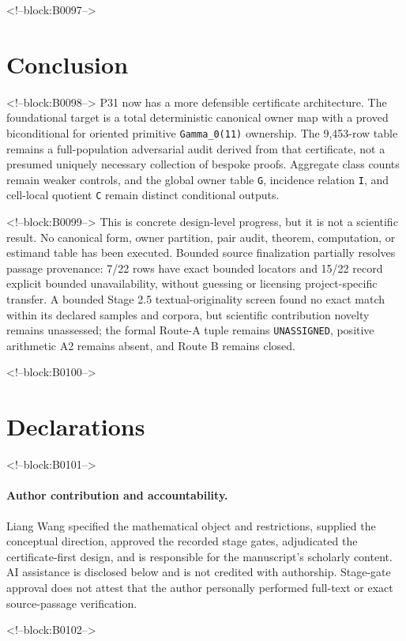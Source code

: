\documentclass[11pt]{article}
\begin{document}
<!--block:B0097-->
\hypertarget{10-conclusion}{%
\section{Conclusion}\label{10-conclusion}}

<!--block:B0098-->
P31 now has a more defensible certificate architecture. The foundational
target is a total deterministic canonical owner map with a proved
biconditional for oriented primitive \texttt{Gamma\_0(11)} ownership.
The 9,453-row table remains a full-population adversarial audit derived
from that certificate, not a presumed uniquely necessary collection of
bespoke proofs. Aggregate class counts remain weaker controls, and the
global owner table \texttt{G}, incidence relation \texttt{I}, and
cell-local quotient \texttt{C} remain distinct conditional outputs.

<!--block:B0099-->
This is concrete design-level progress, but it is not a scientific
result. No canonical form, owner partition, pair audit, theorem,
computation, or estimand table has been executed. Bounded source finalization partially resolves passage provenance: 7/22 rows
have exact bounded locators and 15/22 record explicit bounded unavailability,
without guessing or licensing project-specific transfer. A bounded Stage 2.5 textual-originality
screen found no exact match within its declared samples and corpora, but
scientific contribution novelty remains unassessed; the formal Route-A
tuple remains \texttt{UNASSIGNED}, positive arithmetic A2 remains absent,
and Route B remains closed.

<!--block:B0100-->
\section*{Declarations}

<!--block:B0101-->
\paragraph{Author contribution and accountability.}
Liang Wang specified the mathematical object and restrictions, supplied
the conceptual direction, approved the recorded stage gates,
adjudicated the certificate-first design, and is responsible for the
manuscript's scholarly content. AI assistance is disclosed below and is
not credited with authorship. Stage-gate approval does not attest that
the author personally performed full-text or exact source-passage
verification.

<!--block:B0102-->
\end{document}
